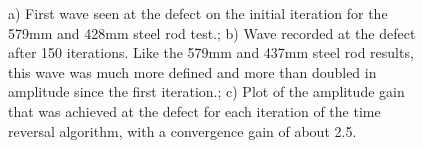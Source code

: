 \documentclass[11pt,letterpaper]{article}%
\begin{document}
 \begin{figure}
\begin{subfigmatrix}{3}
\end{subfigmatrix}

   \caption[all]
   { \label{steelExp2}
   a) First wave seen at the defect on the initial iteration for the 579mm and 428mm steel rod test.; b) Wave recorded at the defect after 150 iterations. Like the 579mm and 437mm steel rod results, this wave was much more defined and more than doubled in amplitude since the first iteration.; c) Plot of the amplitude gain that was achieved at the defect for each iteration of the time reversal algorithm, with a convergence gain of about 2.5.
 }
\end{figure}
\end{document}
